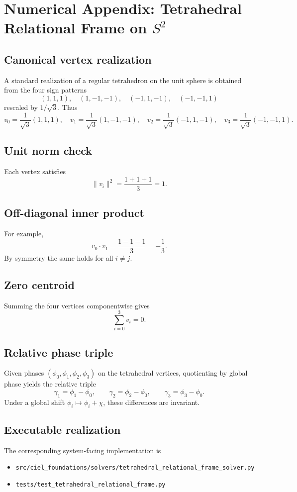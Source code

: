 \appendix
\section{Numerical Appendix: Tetrahedral Relational Frame on $S^2$}
\label{app:tetrahedral-relational-frame}

\subsection{Canonical vertex realization}
A standard realization of a regular tetrahedron on the unit sphere is obtained from the four sign patterns
\begin{equation}
(1,1,1),\quad (1,-1,-1),\quad (-1,1,-1),\quad (-1,-1,1)
\end{equation}
rescaled by $1/\sqrt{3}$. Thus
\begin{equation}
v_0 = \frac{1}{\sqrt{3}}(1,1,1),\quad
v_1 = \frac{1}{\sqrt{3}}(1,-1,-1),\quad
v_2 = \frac{1}{\sqrt{3}}(-1,1,-1),\quad
v_3 = \frac{1}{\sqrt{3}}(-1,-1,1).
\end{equation}

\subsection{Unit norm check}
Each vertex satisfies
\begin{equation}
\|v_i\|^2 = \frac{1+1+1}{3}=1.
\end{equation}

\subsection{Off-diagonal inner product}
For example,
\begin{equation}
v_0\cdot v_1 = \frac{1-1-1}{3} = -\frac13.
\end{equation}
By symmetry the same holds for all $i\neq j$.

\subsection{Zero centroid}
Summing the four vertices componentwise gives
\begin{equation}
\sum_{i=0}^3 v_i = 0.
\end{equation}

\subsection{Relative phase triple}
Given phases $(\phi_0,\phi_1,\phi_2,\phi_3)$ on the tetrahedral vertices, quotienting by global phase yields the relative triple
\begin{equation}
\gamma_1 = \phi_1-\phi_0,
\qquad
\gamma_2 = \phi_2-\phi_0,
\qquad
\gamma_3 = \phi_3-\phi_0.
\end{equation}
Under a global shift $\phi_i \mapsto \phi_i + \chi$, these differences are invariant.

\subsection{Executable realization}
The corresponding system-facing implementation is
\begin{itemize}
  \item \texttt{src/ciel\_foundations/solvers/tetrahedral\_relational\_frame\_solver.py}
  \item \texttt{tests/test\_tetrahedral\_relational\_frame.py}
\end{itemize}
